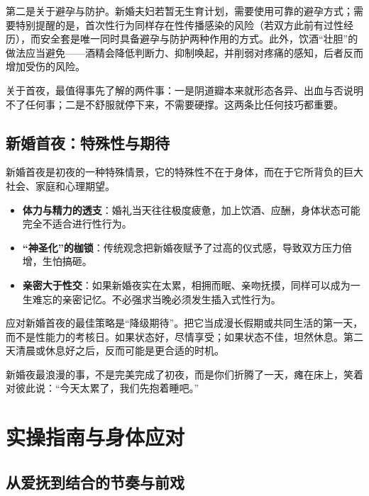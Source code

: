 \documentclass[12pt,UTF8]{ctexbook}
\begin{document}
第二是关于避孕与防护。新婚夫妇若暂无生育计划，需要使用可靠的避孕方式；需要特别提醒的是，首次性行为同样存在性传播感染的风险（若双方此前有过性经历），而安全套是唯一同时具备避孕与防护两种作用的方式。此外，饮酒“壮胆”的做法应当避免——酒精会降低判断力、抑制唤起，并削弱对疼痛的感知，后者反而增加受伤的风险。

\begin{tcolorbox}[colback=pink!5!white,colframe=red!50!black,title=贴心小叮咛]
关于首夜，最值得事先了解的两件事：一是阴道瓣本来就形态各异、出血与否说明不了任何事；二是不舒服就停下来，不需要硬撑。这两条比任何技巧都重要。
\end{tcolorbox}

\subsection{新婚首夜：特殊性与期待}

新婚首夜是初夜的一种特殊情景，它的特殊性不在于身体，而在于它所背负的巨大社会、家庭和心理期望。

\begin{itemize}
\item \textbf{体力与精力的透支}：婚礼当天往往极度疲惫，加上饮酒、应酬，身体状态可能完全不适合进行性行为。
\item \textbf{“神圣化”的枷锁}：传统观念把新婚夜赋予了过高的仪式感，导致双方压力倍增，生怕搞砸。
\item \textbf{亲密大于性交}：如果新婚夜实在太累，相拥而眠、亲吻抚摸，同样可以成为一生难忘的亲密记忆。不必强求当晚必须发生插入式性行为。
\end{itemize}

应对新婚首夜的最佳策略是“降级期待”。把它当成漫长假期或共同生活的第一天，而不是性能力的考核日。如果状态好，尽情享受；如果状态不佳，坦然休息。第二天清晨或休息好之后，反而可能是更合适的时机。

\begin{tcolorbox}[colback=pink!5!white,colframe=red!50!black,title=贴心小叮咛]
新婚夜最浪漫的事，不是完美完成了初夜，而是你们折腾了一天，瘫在床上，笑着对彼此说：“今天太累了，我们先抱着睡吧。”
\end{tcolorbox}

\section{实操指南与身体应对}

\subsection{从爱抚到结合的节奏与前戏}
\end{document}
